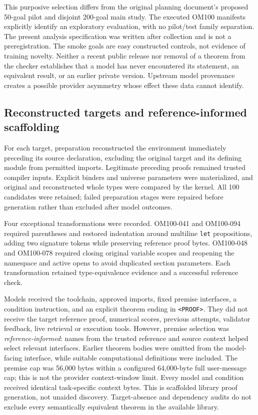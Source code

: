 \documentclass[11pt]{article}
\begin{document}
This purposive selection differs from the original planning document's proposed 50-goal pilot and disjoint 200-goal main study. The executed OM100 manifests explicitly identify an exploratory evaluation, with no pilot/test family separation. The present analysis specification was written after collection and is not a preregistration. The smoke goals are easy constructed controls, not evidence of training novelty. Neither a recent public release nor removal of a theorem from the checker establishes that a model has never encountered its statement, an equivalent result, or an earlier private version. Upstream model provenance creates a possible provider asymmetry whose effect these data cannot identify.

\subsection{Reconstructed targets and reference-informed scaffolding}
\label{sec:methods-inputs}

For each target, preparation reconstructed the environment immediately preceding its source declaration, excluding the original target and its defining module from permitted imports. Legitimate preceding proofs remained trusted compiler inputs. Explicit binders and universe parameters were materialized, and original and reconstructed whole types were compared by the kernel. All 100 candidates were retained; failed preparation stages were repaired before generation rather than excluded after model outcomes.

Four exceptional transformations were recorded. OM100-041 and OM100-094 required parentheses and restored indentation around multiline \texttt{let} propositions, adding two signature tokens while preserving reference proof bytes. OM100-048 and OM100-078 required closing original variable scopes and reopening the namespace and active opens to avoid duplicated section parameters. Each transformation retained type-equivalence evidence and a successful reference check.

Models received the toolchain, approved imports, fixed premise interfaces, a condition instruction, and an explicit theorem ending in \texttt{<PROOF>}. They did not receive the target reference proof, numerical scores, previous attempts, validator feedback, live retrieval or execution tools. However, premise selection was \emph{reference-informed}: names from the trusted reference and source context helped select relevant interfaces. Earlier theorem bodies were omitted from the model-facing interface, while suitable computational definitions were included. The premise cap was 56,000 bytes within a configured 64,000-byte full user-message cap; this is not the provider context-window limit. Every model and condition received identical task-specific context bytes. This is scaffolded library proof generation, not unaided discovery. Target-absence and dependency audits do not exclude every semantically equivalent theorem in the available library.
\end{document}
